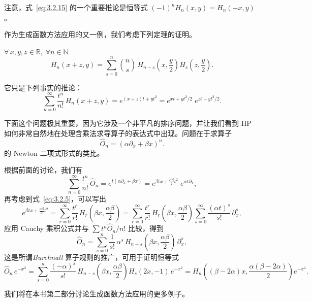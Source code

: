  注意，式~\eqref{eq:3.2.15} 的一个重要推论是恒等式
$(-1)^n H_n(x,y)=H_n(-x,y)$。

\medskip
作为生成函数方法应用的又一例，我们考虑下列定理的证明。

\begin{theorem}[加法]
$\forall\,x,y,z\in\mathbb{R},\;\forall n\in\mathbb{N}$
\begin{equation}
H_n(x+z,y)=\sum_{s=0}^{n}\binom{n}{s}\,
H_{n-s}\!\left(x,\frac{y}{2}\right)
H_s\!\left(z,\frac{y}{2}\right).
\label{eq:3.2.17}
\end{equation}
\end{theorem}

它只是下列事实的推论：
\[
\sum_{n=0}^{\infty}\frac{t^n}{n!}\,H_n(x+z,y)
=e^{(x+z)t+yt^2}
=e^{xt+yt^2/2}\;e^{zt+yt^2/2}.
\tag{3.2.18}
\]

下面这个问题极其重要，因为它涉及一个非平凡的排序问题，并让我们看到 HP 如何非常自然地在处理含乘法求导算子的表达式中出现。问题在于求算子
\begin{equation}
\hat O_n=(\alpha\partial_x+\beta x)^n.
\label{eq:3.2.19}
\end{equation}
的 Newton 二项式形式的类比。

根据前面的讨论，我们有
\[
\sum_{n=0}^{\infty}\frac{t^n}{n!}\,\hat O_n
=e^{t(\alpha\partial_x+\beta x)}
=e^{\beta t x+\frac{\alpha\beta}{2}t^2}\;e^{\alpha t\partial_x},
\]
再考虑到式~\eqref{eq:3.2.5}，可以写出
\[
e^{\beta t x+\frac{\alpha\beta}{2}t^2}
=\sum_{r=0}^{\infty}\frac{t^r}{r!}\,
H_r\!\left(\beta x,\frac{\alpha\beta}{2}\right)
=\sum_{r=0}^{\infty}\frac{t^r}{r!}\,H_r\!\left(\beta x,\frac{\alpha\beta}{2}\right)
 \sum_{s=0}^{\infty}\frac{(\alpha t)^s}{s!}\,\partial_x^s,
\]
应用 Cauchy 乘积公式并与 $\sum t^n\hat O_n/n!$ 比较，得到
\begin{equation}
\hat O_n=\sum_{s=0}^{n}\frac{1}{s!}\,
\alpha^s\,H_{n-s}\!\left(\beta x,\frac{\alpha\beta}{2}\right)\,\partial_x^s,
\label{eq:3.2.22}
\end{equation}
这是所谓\emph{Burchnall} 算子规则的推广，可用于证明恒等式
\begin{equation}
\hat O_n\,e^{-x^2}
=\sum_{s=0}^{n}\frac{(-\alpha)^s}{s!}\,
H_{n-s}\!\left(\beta x,\frac{\alpha\beta}{2}\right)
H_s(2x,-1)\,e^{-x^2}
=H_n\!\left((\beta-2\alpha)x,\frac{\alpha(\beta-2\alpha)}{2}\right)e^{-x^2}.
\label{eq:3.2.23}
\end{equation}

我们将在本书第二部分讨论生成函数方法应用的更多例子。

